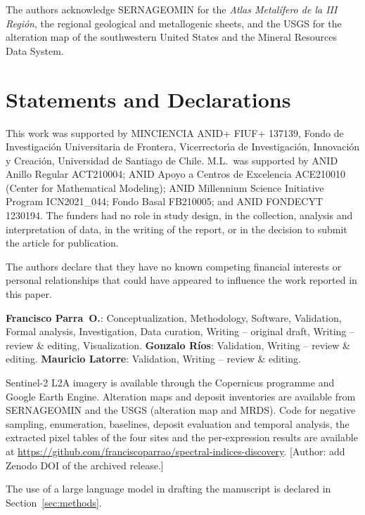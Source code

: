 \documentclass[pdflatex,sn-basic]{sn-jnl}
\begin{document}

The authors acknowledge SERNAGEOMIN for the \emph{Atlas Metal\'ifero de la III Regi\'on}, the regional geological and metallogenic sheets, and the USGS for the alteration map of the southwestern United States \citep{Rockwell2017} and the Mineral Resources Data System.

\section*{Statements and Declarations}

This work was supported by MINCIENCIA ANID+ FIUF+ 137139, Fondo de Investigaci\'on Universitaria de Frontera, Vicerrector\'\i a de Investigaci\'on, Innovaci\'on y Creaci\'on, Universidad de Santiago de Chile. M.L.\ was supported by ANID Anillo Regular ACT210004; ANID Apoyo a Centros de Excelencia ACE210010 (Center for Mathematical Modeling); ANID Millennium Science Initiative Program ICN2021\_044; Fondo Basal FB210005; and ANID FONDECYT 1230194. The funders had no role in study design, in the collection, analysis and interpretation of data, in the writing of the report, or in the decision to submit the article for publication.

The authors declare that they have no known competing financial interests or personal relationships that could have appeared to influence the work reported in this paper.

\textbf{Francisco Parra~O.}: Conceptualization, Methodology, Software, Validation, Formal analysis, Investigation, Data curation, Writing -- original draft, Writing -- review \& editing, Visualization.
\textbf{Gonzalo R\'ios}: Validation, Writing -- review \& editing.
\textbf{Mauricio Latorre}: Validation, Writing -- review \& editing.

Sentinel-2 L2A imagery is available through the Copernicus programme and Google Earth Engine. Alteration maps and deposit inventories are available from SERNAGEOMIN and the USGS (alteration map and MRDS). Code for negative sampling, enumeration, baselines, deposit evaluation and temporal analysis, the extracted pixel tables of the four sites and the per-expression results are available at \url{https://github.com/franciscoparrao/spectral-indices-discovery}. [Author: add Zenodo DOI of the archived release.]

The use of a large language model in drafting the manuscript is declared in Section~\ref{sec:methods}.



\end{document}
